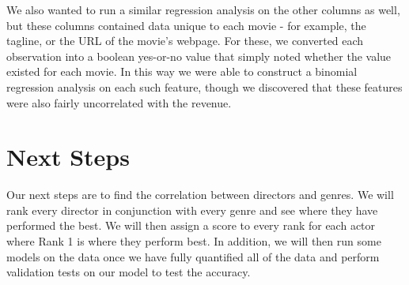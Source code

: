 \documentclass{article}
\begin{document}
We also wanted to run a similar regression analysis on the other columns as well, but these columns contained data unique to each movie - for example, the tagline, or the URL of the movie's webpage.  For these, we converted each observation into a boolean yes-or-no value that simply noted whether the value existed for each movie.  In this way we were able to construct a binomial regression analysis on each such feature, though we discovered that these features were also fairly uncorrelated with the revenue.

\section{Next Steps}

Our next steps are to find the correlation between directors and genres. We will rank every director in conjunction with every genre and see where they have performed the best. We will then assign a score to every rank for each actor where Rank 1 is where they perform best. In addition, we will then run some models on the data once we have fully quantified all of the data and perform validation tests on our model to test the accuracy. 
\end{document}
